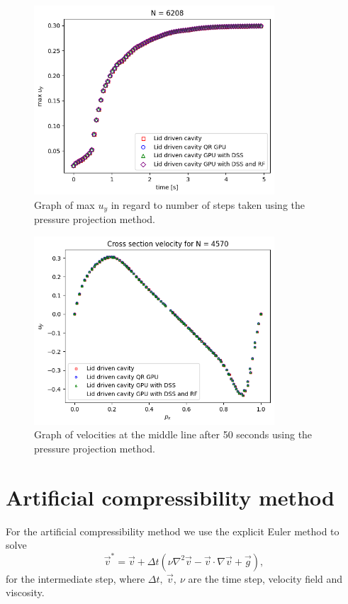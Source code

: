 \documentclass{article}
\begin{document}
\begin{figure}[h!] 
    \centering 
    \includegraphics[width=0.8\textwidth]{plots/lidDriven_convergence.png} 
    \caption{Graph of max $u_y$ in regard to number of steps taken using the pressure projection method.} 
    \label{fig:lidDriven_convergence} 
\end{figure}
\begin{figure}[h!] 
    \centering 
    \includegraphics[width=0.8\textwidth]{plots/lidDriven_cross.png} 
    \caption{Graph of velocities at the middle line after 50 seconds using the pressure projection method.} 
    \label{fig:lidDriven_cross} 
\end{figure}
\section{Artificial compressibility method}
For the artificial compressibility method we use the explicit Euler method to solve 
\begin{equation}
    \vec{v}^* = \vec{v} + \Delta t \left( \nu \nabla^2 \vec{v} - \vec{v}
    \cdot \nabla\vec{v} + \vec{g} \right), 
\end{equation}
for the intermediate step, where \(\Delta t,~\vec{v},~\nu\) are the time step, velocity field 
and viscosity.
\end{document}
